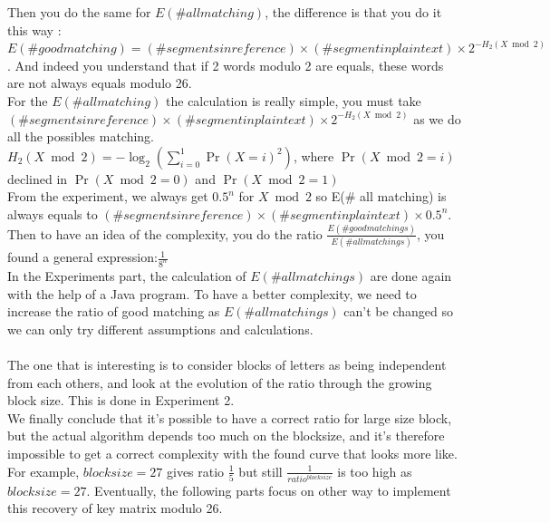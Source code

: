 \documentclass{article}
\begin{document}
Then you do the same for  $E(\# all matching)$, the difference is that you do it this way : $E(\# good matching) = (\# segments in reference) \times (\#segment in plaintext) \times 2^{-H_{2}(X \bmod 2)}$ . And indeed you understand that if 2 words modulo 2 are equals, these words are not always equals modulo 26.\\
${}$\hspace{1em}For the $E(\# all matching)$ the calculation is really simple, you must take $(\# segments in reference) \times (\#segment in plaintext) \times 2^{-H_{2}(X \bmod 2)}$ as we do all the possibles matching.\\
$H_{2}(X \bmod 2) = -\log_2(\sum_{i=0}^{1}{\Pr(X=i)^2})$, where $\Pr(X \bmod 2=i)$ declined in $\Pr(X \bmod 2=0)$ and $\Pr(X \bmod 2 =1)$\\
From the experiment, we always get $0.5^n$ for $X \bmod 2$ so E(\# all matching) is always equals to $(\# segments in reference) \times (\#segment in plaintext) \times 0.5^n$.\\
Then to have an idea of the complexity, you do the ratio $\frac{E(\# good matchings)}{E(\# all matchings)}$, you found a general expression:$\frac{1}{8^n}$\\
In the Experiments part, the calculation of $E(\# all matchings)$ are done again with the help of a Java program.
To have a better complexity, we need to increase the ratio of good matching as $E(\# all matchings)$ can't be changed so we can only try different assumptions and calculations.\\
\\
The one that is interesting is to consider blocks of letters as being independent from each others, and look at the evolution of the ratio through the growing block size. This is done in Experiment 2.\\
We finally conclude that it's possible to have a correct ratio for large size block, but the actual algorithm depends too much on the blocksize, and it's therefore impossible to get a correct complexity with the found curve that looks more like. For example, $blocksize=27$ gives ratio $\frac{1}{5}$ but still $\frac{1}{ratio^{blocksize}}$ is too high as $blocksize = 27$.
Eventually, the following parts focus on other way to implement this recovery of key matrix modulo 26.\\
\end{document}
